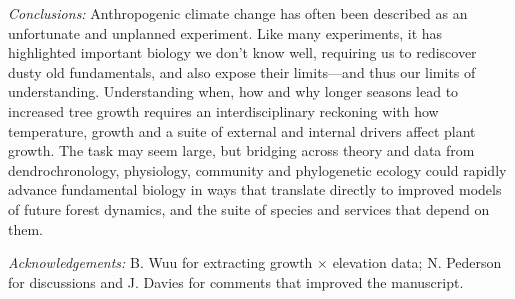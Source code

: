 \documentclass[11pt]{article}
\begin{document}
\emph{Conclusions:} %
Anthropogenic climate change has often been described as an unfortunate and unplanned experiment. Like many experiments, it has highlighted important biology we don't know well, requiring us to rediscover dusty old fundamentals, and also expose their limits---and thus our limits of understanding. Understanding when, how and why longer seasons lead to increased tree growth requires an interdisciplinary reckoning with how temperature, growth and a suite of external and internal drivers affect plant growth. The task may seem large, but bridging across theory and data from dendrochronology, physiology, community and phylogenetic ecology could rapidly advance fundamental biology in ways that translate directly to improved models of future forest dynamics, and the suite of species and services that depend on them. %



\emph{Acknowledgements:} B. Wuu for extracting growth $\times$ elevation data; N. Pederson for discussions and J. Davies for comments that improved the manuscript. 
\end{document}
